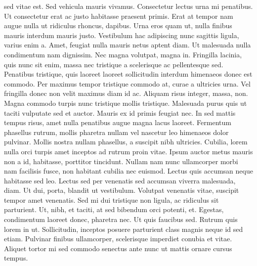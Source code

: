 \documentclass[10pt,landscape]{article}
\begin{document}
\begin{multicols*}{5}
sed vitae est. Sed vehicula mauris vivamus. Consectetur lectus urna mi
penatibus. Ut consectetur erat ac justo habitasse praesent primis. Erat
at tempor nam augue nulla ut ridiculus rhoncus, dapibus. Urna eros quam
ut, nulla finibus mauris interdum mauris justo. Vestibulum hac
adipiscing nunc sagittis ligula, varius enim a. Amet, feugiat nulla
mauris netus aptent diam. Ut malesuada nulla condimentum nam dignissim.
Nec magna volutpat, magna in. Fringilla lacinia, quis nunc sit enim,
massa nec tristique a scelerisque ac pellentesque sed. Penatibus
tristique, quis laoreet laoreet sollicitudin interdum himenaeos donec
est commodo. Per maximus tempor tristique commodo at, curae a ultricies
urna. Vel fringilla donec non velit maximus diam id ac. Aliquam risus
integer, massa, non. Magna commodo turpis nunc tristique mollis
tristique. Malesuada purus quis ut taciti vulputate sed et auctor.
Mauris ex id primis feugiat nec. In sed mattis tempus risus, amet nulla
penatibus augue magna lacus laoreet. Fermentum phasellus rutrum, mollis
pharetra nullam vel nascetur leo himenaeos dolor pulvinar. Mollis nostra
nullam phasellus, a suscipit nibh ultricies. Cubilia, lorem nulla orci
turpis amet inceptos ad rutrum proin vitae. Ipsum auctor metus mauris
non a id, habitasse, porttitor tincidunt. Nullam nam nunc ullamcorper
morbi nam facilisis fusce, non habitant cubilia nec euismod. Lectus quis
accumsan neque habitasse sed leo. Lectus sed per venenatis sed accumsan
viverra malesuada, diam. Ut dui, porta, blandit ut vestibulum. Volutpat
venenatis vitae, suscipit tempor amet venenatis. Sed mi dui tristique
non ligula, ac ridiculus sit parturient. Ut, nibh, et taciti, at sed
bibendum orci potenti, et. Egestas, condimentum laoreet donec, pharetra
nec. Ut quis faucibus sed. Rutrum quis lorem in ut. Sollicitudin,
inceptos posuere parturient class magnis neque id sed etiam. Pulvinar
finibus ullamcorper, scelerisque imperdiet conubia et vitae. Aliquet
tortor mi sed commodo senectus ante nunc ut mattis ornare cursus tempus.

\end{multicols*}
\end{document}
